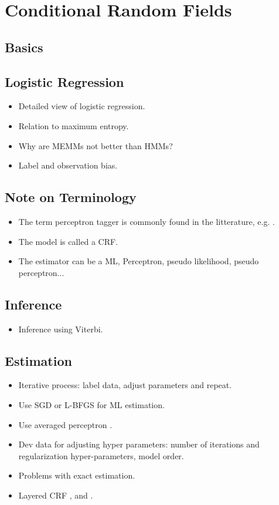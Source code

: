 \chapter{Conditional Random Fields}
\section{Basics}
\cite{Lafferty2001}
\section{Logistic Regression}
\begin{itemize}
\item Detailed view of logistic regression. 
\item Relation to maximum entropy.
\item Why are MEMMs not better than HMMs?
\item Label and observation bias.
\end{itemize}
\section{Note on Terminology}
\begin{itemize}
\item The term perceptron tagger is commonly found in the litterature, e.g. \cite{Collins2002}.
\item The model is called a CRF.
\item The estimator can be a ML, Perceptron, pseudo likelihood, pseudo
  perceptron...
\end{itemize}

\section{Inference}
\begin{itemize}
\item Inference using Viterbi.
\end{itemize}

\section{Estimation}
\begin{itemize}
\item Iterative process: label data, adjust parameters and repeat.
\item Use SGD or L-BFGS \citep{Vishwanathan2006} for ML estimation. 
\item Use averaged perceptron \citep{Collins2002}.
\item Dev data for adjusting hyper parameters: number of iterations and
  regularization hyper-parameters, model order.
\item Problems with exact estimation.
\item Layered CRF \cite{Mueller2013}, \cite{Weiss2010} and \cite{Charniak2005}.
\end{itemize}

